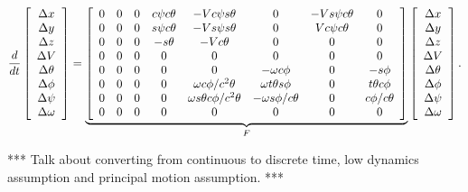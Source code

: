 {\scriptsize
\begin{align}
\label{eq:kfjacobianresult}
\frac{d}{dt}\left[\begin{array}{c}
\Delta x \\ \Delta y \\ \Delta z \\ \Delta V \\ \Delta \theta \\ \Delta \phi \\ \Delta \psi \\ \Delta \omega
\end{array}\right] =
\underbrace{\left[\begin{array}{c c c c c c c c}
0 & 0 & 0 & c\psi c\theta & -V c\psi s\theta               & 0                     & -V s\psi c\theta & 0 \\
0 & 0 & 0 & s\psi c\theta & -V s\psi s\theta               & 0                     & V c\psi c\theta  & 0 \\
0 & 0 & 0 & -s\theta      & -V c\theta                     & 0                     & 0                & 0 \\
0 & 0 & 0 & 0             & 0                              & 0                     & 0                & 0 \\
0 & 0 & 0 & 0             & 0                              & -\omega c\phi         & 0                & -s\phi \\
0 & 0 & 0 & 0             & \omega c\phi/c^2\theta         & \omega t\theta s\phi  & 0                & t\theta c\phi \\
0 & 0 & 0 & 0             & \omega s\theta c\phi/c^2\theta & -\omega s\phi/c\theta & 0                & c\phi/c\theta \\
0 & 0 & 0 & 0             & 0                              & 0                     & 0                & 0
\end{array}\right]}_{F}
\left[\begin{array}{c}
\Delta x \\ \Delta y \\ \Delta z \\ \Delta V \\ \Delta \theta \\ \Delta \phi \\ \Delta \psi \\ \Delta \omega
\end{array}\right].
\end{align}
}

*** Talk about converting from continuous to discrete time, low dynamics assumption and principal motion assumption. ***

